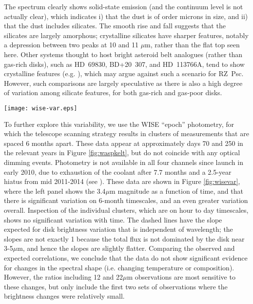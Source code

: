 \documentclass[]{rsos}
\begin{document}
The spectrum clearly shows solid-state emission (and the continuum level is not actually
clear), which indicates i) that the dust is of order microns in size, and ii) that the
dust includes silicates. The smooth rise and fall suggests that the silicates are largely
amorphous; crystalline silicates have sharper features, notably a depression between two
peaks at 10 and 11 $\mu$m, rather than the flat top seen here. Other systems thought to
host bright asteroid belt analogues (rather than gas-rich disks), such as HD~69830,
BD+20~307, and HD~113766A, tend to show crystalline features
(e.g. \cite{2005ApJ...626.1061B,2005Natur.436..363S,2012A&A...542A..90O}), which may
argue against such a scenario for RZ~Psc. However, such comparisons are largely
speculative as there is also a high degree of variation among silicate features, for both
gas-rich and gas-poor disks.

\begin{figure*}
  \begin{center}
    \hspace{-0.5cm} \texttt{[image: wise-var.eps]}
    \caption{WISE epoch photometry at 3.4, 4.6, 12, and 22$\mu$m (W1, W2, W3, and W4, in
      magnitudes). The left panel shows the time variation in W1 over 5.5
      years. Subsequent panels show how W1 correlates with W2, W3, and W4, which do not
      have observations at all W1 epochs. The dashed lines show the slope expected for
      constant disk flux variation with wavelength (the variation is smaller in W1/2
      because the total flux is not dominated by the disk).}\label{fig:wisevar}
  \end{center}
\end{figure*}

To further explore this variability, we use the WISE ``epoch'' photometry, for which the
telescope scanning strategy results in clusters of measurements that are spaced 6 months
apart. These data appear at approximately days 70 and 250 in the relevant years in Figure
\ref{fig:waspkelt}, but do not coincide with any optical dimming events. Photometry is
not available in all four channels since launch in early 2010, due to exhaustion of the
coolant after 7.7 months and a 2.5-year hiatus from mid 2011-2014 (see
\cite{2010AJ....140.1868W,2014ApJ...792...30M}). These data are shown in Figure
\ref{fig:wisevar}, where the left panel shows the 3.4$\mu$m magnitude as a function of
time, and that there is significant variation on 6-month timescales, and an even greater
variation overall. Inspection of the individual clusters, which are on hour to day
timescales, shows no significant variation with time. The dashed lines have the slope
expected for disk brightness variation that is independent of wavelength; the slopes are
not exactly 1 because the total flux is not dominated by the disk near 3-5$\mu$m, and
hence the slopes are slightly flatter. Comparing the observed and expected correlations,
we conclude that the data do not show significant evidence for changes in the spectral
shape (i.e. changing temperature or composition). However, the ratios including 12 and
22$\mu$m observations are most sensitive to these changes, but only include the first two
sets of observations where the brightness changes were relatively small.
\end{document}
